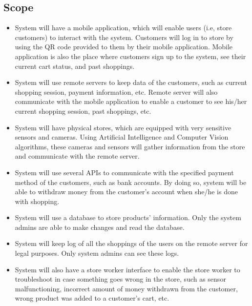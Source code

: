 \documentclass[11pt]{article}
\begin{document}
    \subsection{Scope}
        \begin{itemize}
        \item System will have a mobile application, which will enable users (i.e, store customers) to interact with the system. 
            Customers will log in to store by using the QR code provided to them by their mobile application. 
            Mobile application is also the place where customers sign up to the system, see their current cart status, and past shoppings.
        \item System will use remote servers to keep data of the customers, such as current shopping session, payment information, etc. 
            Remote server will also communicate with the mobile application to enable a customer to see his/her current shopping session, 
            past shoppings, etc. 
        \item System will have physical stores, which are equipped with very sensitive sensors and cameras. Using Artificial Intelligence 
            and Computer Vision algorithms, these cameras and sensors will gather information from the store and communicate with the remote server.
        
        \item System will use several APIs to communicate with the specified payment method of the customers, such as bank accounts. 
            By doing so, system will be able to withdraw money from the customer's account when she/he is done with shopping.
        
        \item System will use a database to store products' information. Only the system admins are able to make changes and read the database.
        
        \item System will keep log of all the shoppings of the users on the remote server for legal purposes. Only system admins can see these logs.
        
        \item System will also have a store worker interface to enable the store worker to troubleshoot in case something goes wrong in the store, 
        such as sensor malfunctioning, incorrect amount of money withdrawn from the customer, wrong product was added to a customer's cart, etc.
        \end{itemize}
\end{document}
